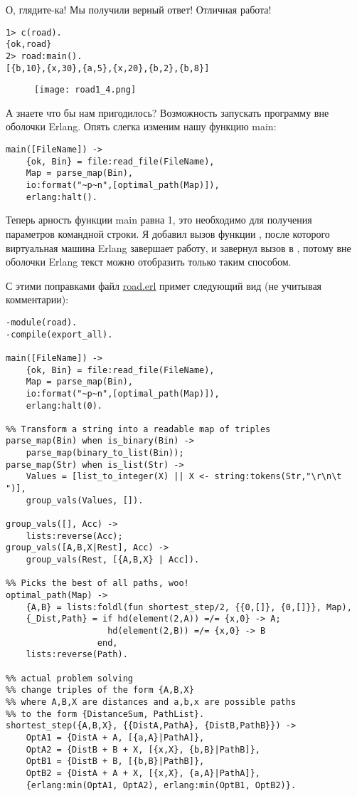 О, глядите\--ка!
Мы получили верный ответ!
Отличная работа!
\begin{lstlisting}[style=erlang]
1> c(road).
{ok,road}
2> road:main().
[{b,10},{x,30},{a,5},{x,20},{b,2},{b,8}]
\end{lstlisting}

\begin{figure}[h!]
    \texttt{[image: road1\_4.png]}
\end{figure}

А знаете что бы нам пригодилось?
Возможность запускать программу вне оболочки Erlang.
Опять слегка изменим нашу функцию main:
\begin{lstlisting}[style=erlang]
main([FileName]) ->
    {ok, Bin} = file:read_file(FileName),
    Map = parse_map(Bin),
    io:format("~p~n",[optimal_path(Map)]),
    erlang:halt().
\end{lstlisting}

Теперь арность функции main равна 1, это необходимо для получения параметров командной строки.
Я добавил вызов функции , после которого виртуальная машина Erlang завершает работу, и завернул вызов  в , потому вне оболочки Erlang текст можно отобразить только таким способом.

С этими поправками файл \href{http://learnyousomeerlang.com/static/erlang/road.erl}{road.erl} примет следующий вид (не учитывая комментарии):
\begin{lstlisting}[style=erlang]
-module(road).
-compile(export_all).
 
main([FileName]) ->
    {ok, Bin} = file:read_file(FileName),
    Map = parse_map(Bin),
    io:format("~p~n",[optimal_path(Map)]),
    erlang:halt(0).
 
%% Transform a string into a readable map of triples
parse_map(Bin) when is_binary(Bin) ->
    parse_map(binary_to_list(Bin));
parse_map(Str) when is_list(Str) ->
    Values = [list_to_integer(X) || X <- string:tokens(Str,"\r\n\t ")],
    group_vals(Values, []).
 
group_vals([], Acc) ->
    lists:reverse(Acc);
group_vals([A,B,X|Rest], Acc) ->
    group_vals(Rest, [{A,B,X} | Acc]).
 
%% Picks the best of all paths, woo!
optimal_path(Map) ->
    {A,B} = lists:foldl(fun shortest_step/2, {{0,[]}, {0,[]}}, Map),
    {_Dist,Path} = if hd(element(2,A)) =/= {x,0} -> A;
                    hd(element(2,B)) =/= {x,0} -> B
                  end,
    lists:reverse(Path).
 
%% actual problem solving
%% change triples of the form {A,B,X}
%% where A,B,X are distances and a,b,x are possible paths
%% to the form {DistanceSum, PathList}.
shortest_step({A,B,X}, {{DistA,PathA}, {DistB,PathB}}) ->
    OptA1 = {DistA + A, [{a,A}|PathA]},
    OptA2 = {DistB + B + X, [{x,X}, {b,B}|PathB]},
    OptB1 = {DistB + B, [{b,B}|PathB]},
    OptB2 = {DistA + A + X, [{x,X}, {a,A}|PathA]},
    {erlang:min(OptA1, OptA2), erlang:min(OptB1, OptB2)}.
\end{lstlisting}

